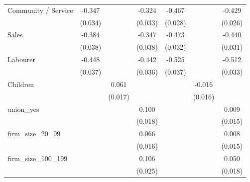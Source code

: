 {\begin{tabular}{l*{6}{c}}
Community / Service &      -0.347\sym{***}&                     &      -0.324\sym{***}&      -0.467\sym{***}&                     &      -0.429\sym{***}\\
                    &     (0.034)         &                     &     (0.033)         &     (0.028)         &                     &     (0.026)         \\
Sales               &      -0.384\sym{***}&                     &      -0.347\sym{***}&      -0.473\sym{***}&                     &      -0.440\sym{***}\\
                    &     (0.038)         &                     &     (0.038)         &     (0.032)         &                     &     (0.031)         \\
Labourer            &      -0.448\sym{***}&                     &      -0.442\sym{***}&      -0.525\sym{***}&                     &      -0.512\sym{***}\\
                    &     (0.037)         &                     &     (0.036)         &     (0.037)         &                     &     (0.033)         \\
Children            &                     &       0.061\sym{***}&                     &                     &      -0.016         &                     \\
                    &                     &     (0.017)         &                     &                     &     (0.016)         &                     \\
union\_yes           &                     &                     &       0.100\sym{***}&                     &                     &       0.009         \\
                    &                     &                     &     (0.018)         &                     &                     &     (0.015)         \\
firm\_size\_20\_99     &                     &                     &       0.066\sym{***}&                     &                     &       0.008         \\
                    &                     &                     &     (0.016)         &                     &                     &     (0.015)         \\
firm\_size\_100\_199   &                     &                     &       0.106\sym{***}&                     &                     &       0.050\sym{***}\\
                    &                     &                     &     (0.025)         &                     &                     &     (0.018)         \\

\end{tabular}}
